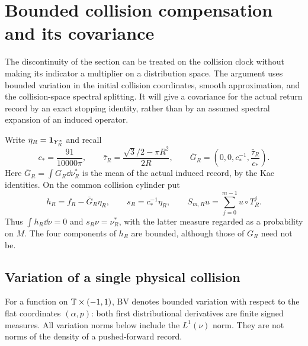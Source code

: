 \section{Bounded collision compensation and its covariance}
\label{sec:collision-covariance}
The discontinuity of the section can be treated on the collision clock
without making its indicator a multiplier on a distribution space. The
argument uses bounded variation in the initial collision coordinates,
smooth approximation, and the collision-space spectral splitting. It
will give a covariance for the actual return record by an exact stopping
identity, rather than by an assumed spectral expansion of an induced
operator.

Write $\eta_R=\mathbf1_{Y_R^*}$ and recall
\begin{equation}\label{eq:compensation-normalizations}
 c_* = \frac{91}{10000\pi},\qquad
 \bar\tau_R=\frac{\sqrt3/2-\pi R^2}{2R},\qquad
 \bar G_R=\left(0,0,c_*^{-1},\frac{\bar\tau_R}{c_*}\right).
\end{equation}
Here $\bar G_R=\int G_R\dd\nu_R^*$ is the mean of the actual induced
record, by the Kac identities. On the common collision cylinder put
\begin{equation}\label{eq:bounded-compensation}
 h_R=f_R-\bar G_R\eta_R,
 \qquad s_R=c_*^{-1}\eta_R,
 \qquad S_{m,R}u=\sum_{j=0}^{m-1}u\circ T_R^j.
\end{equation}
Thus $\int h_R\dd\nu=0$ and $s_R\nu=\nu_R^*$, with the latter
measure regarded as a probability on $M$. The four components of $h_R$
are bounded, although those of $G_R$ need not be.

\subsection{Variation of a single physical collision}
For a function on $\mathbb T\times(-1,1)$, $\mathrm{BV}$ denotes bounded
variation with respect to the flat coordinates $(\alpha,p)$: both
first distributional derivatives are finite signed measures. All
variation norms below include the $L^1(\nu)$ norm. They are not norms
of the density of a pushed-forward record.

